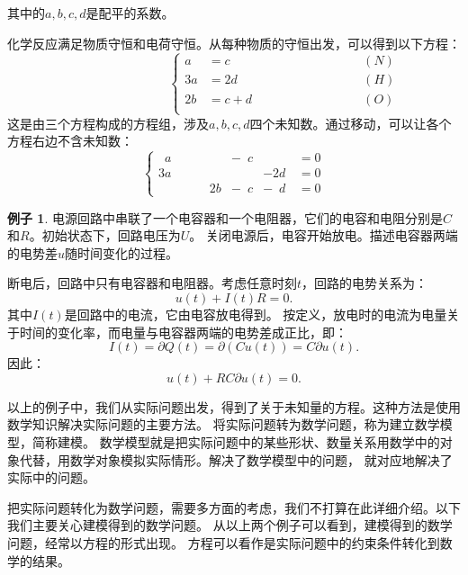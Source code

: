 \documentclass[12pt,UTF8]{ctexbook}
\theoremstyle{definition}
\newtheorem{ex}{例子}[section]
\theoremstyle{plain}
\begin{document}
\begin{center}
\end{center}

其中的$a, b, c, d$是配平的系数。

化学反应满足物质守恒和电荷守恒。从每种物质的守恒出发，可以得到以下方程：
$$ \qquad \qquad \qquad \qquad \left\{
    \begin{array}{rll}
a &= c &\qquad \qquad \qquad \qquad (N) \\
3a &= 2d &\qquad \qquad \qquad \qquad (H) \\
2b &= c + d &\qquad \qquad \qquad \qquad (O) \\
\end{array}
\right. 
$$
这是由三个方程构成的方程组，涉及$a, b, c, d$四个未知数。通过移动，可以让各个方程右边不含未知数：
$$\left\{
    \begin{array}{rrrrl}
\phantom{0}a &\phantom{+ 0b} &- \phantom{0}c &\phantom{+ 0b}\, &= 0  \\
3a &\phantom{+ 0b} &\phantom{- 0c} &- 2d\, &= 0  \\
\phantom{0a} &\phantom{+ }\quad 2b &- \phantom{0}c &- \phantom{0}d\, &= 0  
\end{array}
\right. 
$$

\begin{ex}
    电源回路中串联了一个电容器和一个电阻器，它们的电容和电阻分别是$C$和$R$。初始状态下，回路电压为$U$。
    关闭电源后，电容开始放电。描述电容器两端的电势差$u$随时间变化的过程。
\end{ex}

断电后，回路中只有电容器和电阻器。考虑任意时刻$t$，回路的电势关系为：
$$ u(t) + I(t)R = 0.$$
其中$I(t)$是回路中的电流，它由电容放电得到。
按定义，放电时的电流为电量关于时间的变化率，而电量与电容器两端的电势差成正比，即：
$$ I(t) = \partial Q(t) = \partial (Cu(t)) = C\partial  u(t).$$
因此：
$$ u(t) + RC\partial  u(t) = 0.$$

以上的例子中，我们从实际问题出发，得到了关于未知量的方程。这种方法是使用数学知识解决实际问题的主要方法。
将实际问题转为数学问题，称为建立数学模型，简称建模。
数学模型就是把实际问题中的某些形状、数量关系用数学中的对象代替，用数学对象模拟实际情形。解决了数学模型中的问题，
就对应地解决了实际中的问题。

把实际问题转化为数学问题，需要多方面的考虑，我们不打算在此详细介绍。以下我们主要关心建模得到的数学问题。
从以上两个例子可以看到，建模得到的数学问题，经常以方程的形式出现。
方程可以看作是实际问题中的约束条件转化到数学的结果。
\end{document}
